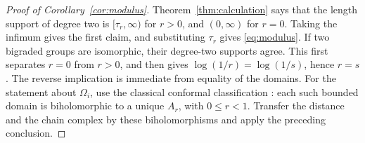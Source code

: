 \documentclass[12pt]{amsart}
\theoremstyle{definition}
\theoremstyle{remark}
\numberwithin{equation}{section}
\begin{document}
\begin{proof}[Proof of Corollary~\ref{cor:modulus}]
Theorem~\ref{thm:calculation} says that the length support of degree two is $[\tau_r,\infty)$ for $r>0$, and $(0,\infty)$ for $r=0$. Taking the infimum gives the first claim, and substituting $\tau_r$ gives \eqref{eq:modulus}. If two bigraded groups are isomorphic, their degree-two supports agree. This first separates $r=0$ from $r>0$, and then gives $\log(1/r)=\log(1/s)$, hence $r=s$. The reverse implication is immediate from equality of the domains. For the statement about $\Omega_i$, use the classical conformal classification \cite[\S12]{BM}: each such bounded domain is biholomorphic to a unique $A_r$, with $0\le r<1$. Transfer the distance and the chain complex by these biholomorphisms and apply the preceding conclusion.
\end{proof}
\end{document}
